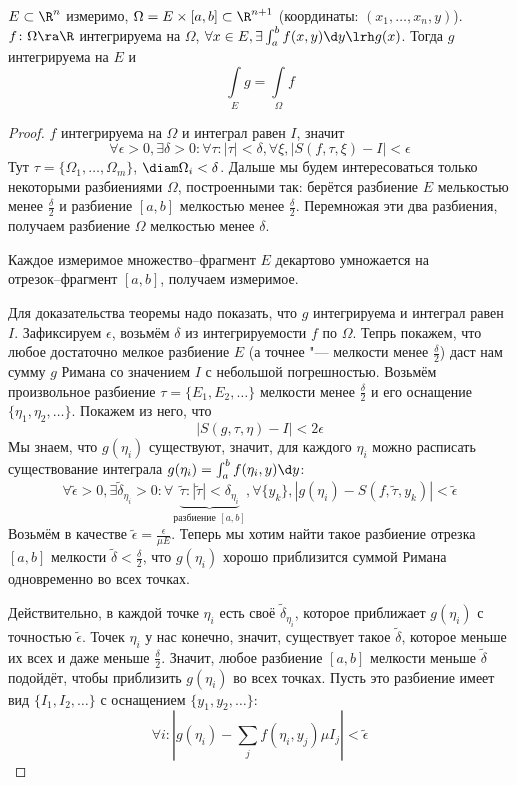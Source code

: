 \begin{theorem}
	$E \subset \R^n$ измеримо, $\Omega = E \times [a, b] \subset \R^{n+1}$ (координаты: $(x_1, \dots, x_n, y)$).
	$f\colon \Omega \ra \R$ интегрируема на $\Omega$, $\forall x \in E, \exists \int_a^b f(x,y) \d y \lrh g(x)$.
	Тогда $g$ интегрируема на $E$ и
	\[ \int\limits_E g = \int\limits_\Omega f \]
\end{theorem}
\begin{proof}
	$f$ интегрируема на $\Omega$ и интеграл равен $I$, значит
	\[
		\forall \epsilon > 0, \exists \delta > 0\colon \forall \tau\colon |\tau| < \delta,
		\forall \xi, \left|S(f,\tau,\xi) - I\right| < \epsilon
	\]
	Тут $\tau = \{\Omega_1, \dots, \Omega_m\}$, $\diam \Omega_i < \delta$.
	Дальше мы будем интересоваться только некоторыми разбиениями $\Omega$, построенными так:
	берётся разбиение $E$ мелькостью менее $\frac\delta2$ и разбиение $[a, b]$ мелкостью менее $\frac\delta 2$.
	Перемножая эти два разбиения, получаем разбиение $\Omega$ мелкостью менее $\delta$.
	\begin{Rem}
		Каждое измеримое множество--фрагмент $E$ декартово умножается на \\отрезок--фрагмент $[a, b]$, получаем измеримое.
	\end{Rem}

	Для доказательства теоремы надо показать, что $g$ интегрируема и интеграл равен $I$.
	Зафиксируем $\epsilon$, возьмём $\delta$ из интегрируемости $f$ по $\Omega$.
	Тепрь покажем, что любое достаточно мелкое разбиение $E$ (а точнее "--- мелкости менее $\frac\delta 2$) даст нам сумму $g$ Римана со значением $I$ с небольшой погрешностью.
	Возьмём произвольное разбиение $\tau = \{E_1, E_2, \dots\}$ мелкости менее $\frac\delta2$ и его оснащение $\{\eta_1, \eta_2, \dots\}$.
	Покажем из него, что
	\[
		\left| S(g, \tau, \eta) - I \right| < 2\epsilon
	\]
	Мы знаем, что $g(\eta_i)$ существуют, значит, для каждого $\eta_i$ можно расписать существование интеграла $g(\eta_i)=\int_a^b f(\eta_i, y)\d y$:
	\[
		\forall \tilde\epsilon>0, \exists \tilde\delta_{\eta_i} > 0\colon \forall \underbrace{\tilde\tau\colon |\tilde\tau| < \delta_{\eta_i}}_{\text{разбиение }[a, b]},
		\forall \{y_k\}, \left| g(\eta_i) - S(f, \tilde\tau, y_k) \right| < \tilde\epsilon
	\]
	Возьмём в качестве $\tilde\epsilon = \frac\epsilon{\mu E}$.
	Теперь мы хотим найти такое разбиение отрезка $[a, b]$ мелкости $\tilde\delta < \frac\delta 2$, что $g(\eta_i)$ хорошо приблизится суммой Римана одновременно во всех точках.

	Действительно, в каждой точке $\eta_i$ есть своё $\tilde\delta_{\eta_i}$, которое приближает $g(\eta_i)$ с точностью $\tilde\epsilon$.
	Точек $\eta_i$ у нас конечно, значит, существует такое $\tilde\delta$, которое меньше их всех и даже меньше $\frac\delta2$.
	Значит, любое разбиение $[a, b]$ мелкости меньше $\tilde\delta$ подойдёт, чтобы приблизить $g(\eta_i)$ во всех точках.
	Пусть это разбиение имеет вид $\{I_1, I_2, \dots\}$ с оснащением $\{y_1, y_2, \dots\}$:
	\[
		\forall i\colon \left| g(\eta_i) - \sum_j f(\eta_i, y_j) \mu I_j \right| < \tilde\epsilon
	\]


\end{proof}
